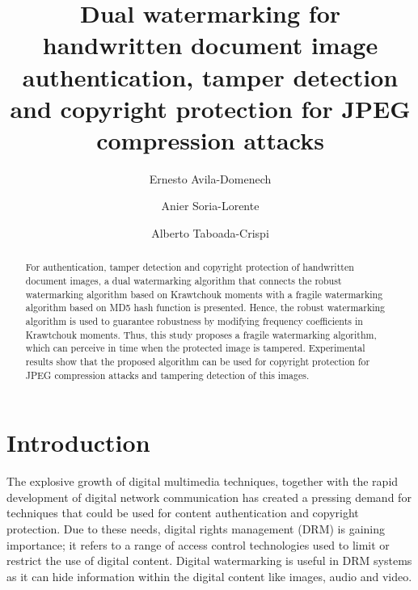 \documentclass[runningheads]{llncs}
\begin{document}
%
\title{Dual watermarking for handwritten document image authentication, tamper detection and copyright protection for JPEG compression attacks}
%
%
\author{Ernesto Avila-Domenech \and
Anier Soria-Lorente \and
Alberto Taboada-Crispi}
%
%
%
\maketitle              %
%
\begin{abstract}
For authentication, tamper detection and copyright protection of handwritten document images, a dual watermarking algorithm that connects the robust watermarking algorithm based on Krawtchouk moments with a fragile watermarking algorithm based on MD5 hash function is presented. Hence, the robust watermarking algorithm is used to guarantee robustness by modifying frequency coefficients in Krawtchouk moments. Thus, this study proposes a fragile watermarking algorithm, which can perceive in time when the protected image is tampered. Experimental results show that the proposed algorithm can be used for copyright protection for JPEG compression attacks and tampering detection of this images.

\end{abstract}
%
%
%
\section{Introduction}
The explosive growth of digital multimedia techniques, together with the rapid development of digital network communication has created a pressing demand for techniques that could be used for content authentication and copyright protection. Due to these needs, digital rights management (DRM) is gaining importance; it refers to a range of access control technologies used to limit or restrict the use of digital content. Digital watermarking is useful in DRM systems as it can hide information within the digital content like images, audio and video.
\end{document}
